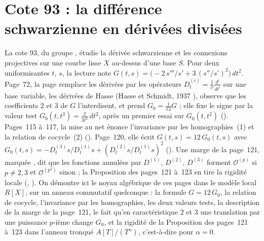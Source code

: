 \section[Cote 93 : la différence schwarzienne en dérivées divisées]{Cote 93 : la différence schwarzienne en dérivées divisées\protect{}}\label{sec:93}

La cote 93, du groupe , étudie la dérivée schwarzienne et les connexions projectives sur une courbe lisse $X$ au-dessus d'une base $S$. Pour deux uniformisantes $t$, $s$, la lecture note $G(t,s) = \bigl(-2\,s'''/s' + 3\,(s''/s')^2\bigr)\,dt^2$. Page~72, la page remplace les dérivées par les opérateurs $D^{(i)}_t = \frac{1}{i!}\frac{d^i}{dt^i}$ sur une base variable, les dérivées de Hasse (Hasse et Schmidt, 1937 \cite{hasseschmidt1937}), observe que les coefficients $2$ et $3$ de $G$ l'interdisent, et prend $G_0 = \frac{1}{12}G$ ; elle fixe le signe par la valeur test $G_0(t, t^3) = \frac{2}{3t^2}\,dt^2$, après un premier essai sur $G_0(t, t^2)$ (). Pages~115 à~117, la mise au net énonce l'invariance par les homographies~(1) et la relation de cocycle~(2) (). Page~120, elle écrit $G(t,s) = 12\,G_0(t,s)$ avec $G_0(t,s) = -D^{(3)}_t s/D^{(1)}_t s + (D^{(2)}_t s/D^{(1)}_t s)^2$ (). Une marge de la page~121, marquée , dit que les fonctions annulées par $D^{(1)}$, $D^{(2)}$, $D^{(3)}$ forment $\mathcal O^{(p)}$ si $p \neq 2, 3$ et $\mathcal O^{(p^2)}$ sinon ; la Proposition des pages~121 à~123 en tire la rigidité locale (, ). On démontre ici le noyau algébrique de ces pages dans le modèle local $R[X]$, sur un anneau commutatif quelconque : la formule $G = 12\,G_0$, la relation de cocycle, l'invariance par les homographies, les deux valeurs tests, la description de la marge de la page~121, le fait qu'en caractéristique $2$ et $3$ une translation par une puissance $p$-ième change $G_0$, et la rigidité de la Proposition des pages~121 à~123 dans l'anneau tronqué $A[T]/(T^n)$, c'est-à-dire pour $\alpha = 0$.

